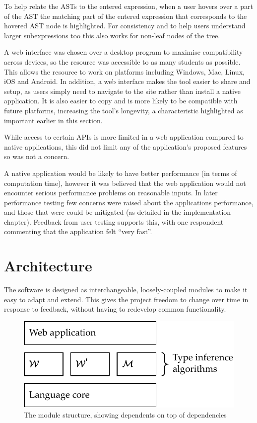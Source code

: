 \documentclass[a4paper,fleqn,oneside,12pt]{report}
\begin{document}
To help relate the ASTs to the entered expression, when a user hovers over a part of the AST the matching part of the entered expression that corresponds to the hovered AST node is highlighted. For consistency and to help users understand larger subexpressions too this also works for non-leaf nodes of the tree.

A web interface was chosen over a desktop program to maximise compatibility across devices, so the resource was accessible to as many students as possible. This allows the resource to work on platforms including Windows, Mac, Linux, iOS and Android. In addition, a web interface makes the tool easier to share and setup, as users simply need to navigate to the site rather than install a native application. It is also easier to copy and is more likely to be compatible with future platforms, increasing the tool's longevity, a characteristic highlighted as important earlier in this section.

While access to certain APIs is more limited in a web application compared to native applications, this did not limit any of the application's proposed features so was not a concern.

A native application would be likely to have better performance (in terms of computation time), however it was believed that the web application would not encounter serious performance problems on reasonable inputs. In later performance testing few concerns were raised about the applications performance, and those that were could be mitigated (as detailed in the implementation chapter). Feedback from user testing supports this, with one respondent commenting that the application felt ``very fast''.

\section{Architecture}\label{id:h.l33hnjbawceh}

The software is designed as interchangeable, loosely-coupled modules to make it easy to adapt and extend. This gives the project freedom to change over time in response to feedback, without having to redevelop common functionality.

{\centering \begin{figure}[h!]
  \centering
  \includegraphics[width=0.6\linewidth]{images/module_structure.pdf}
  \caption{The module structure, showing dependents on top of dependencies}
\end{figure} \par}
\end{document}
